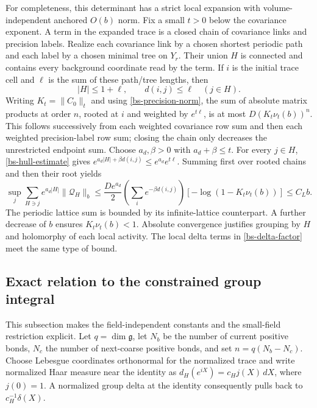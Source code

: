 \documentclass[11pt]{article}
\theoremstyle{remark}
\begin{document}
For completeness, this determinant has a strict local
expansion with volume-independent anchored $O(b)$ norm.
Fix a small $t>0$ below the covariance exponent. A term
in the expanded trace is a closed chain of covariance
links and precision labels. Realize each covariance link
by a chosen shortest periodic path and each label by a
chosen minimal tree on $Y_r$. Their union $H$ is connected
and contains every background coordinate read by the term.
If $i$ is the initial trace cell and $\ell$ is the sum of
these path/tree lengths, then
\begin{equation}\label{bs-hull-estimate}
 |H|\le1+\ell,\qquad d(i,j)\le\ell\quad(j\in H).
\end{equation}
Writing $K_t=\|C_0\|_t$ and using
\eqref{bs-precision-norm}, the sum of absolute matrix
products at order $n$, rooted at $i$ and weighted by
$e^{t\ell}$, is at most $D(K_t\nu_t(b))^n$.
This follows successively from each weighted covariance
row sum and then each weighted precision-label row sum;
closing the chain only decreases the unrestricted endpoint
sum. Choose $a_d,\beta>0$ with $a_d+\beta\le t$.
For every $j\in H$, \eqref{bs-hull-estimate} gives
$e^{a_d|H|+\beta d(i,j)}\le e^{a_d}e^{t\ell}$.
Summing first over rooted chains and then their root yields
\begin{equation}\label{bs-det-bound}
 \sup_j\sum_{H\ni j}e^{a_d|H|}\|\mathcal Q_H\|_b
 \le\frac{De^{a_d}}2
       \left(\sum_i e^{-\beta d(i,j)}\right)
       [-\log(1-K_t\nu_t(b))]\le C_L b.
\end{equation}
The periodic lattice sum is bounded by its infinite-lattice
counterpart. A further decrease of $b$ ensures
$K_t\nu_t(b)<1$. Absolute convergence justifies grouping by
$H$ and holomorphy of each local activity. The local delta
terms in \eqref{bs-delta-factor} meet the same type of bound.

\subsection{Exact relation to the constrained group integral}

This subsection makes the field-independent constants and the
small-field restriction explicit. Let $q=\dim\mathfrak g$,
let $N_b$ be the number of current positive bonds, $N_c$ the
number of next-coarse positive bonds, and set
$n=q(N_b-N_c)$. Choose Lebesgue coordinates orthonormal for
the normalized trace and write normalized Haar measure near
the identity as
$d_H(e^{iX})=c_H j(X)\,dX$, where $j(0)=1$.
A normalized group delta at the identity consequently pulls
back to $c_H^{-1}\delta(X)$.
\end{document}
